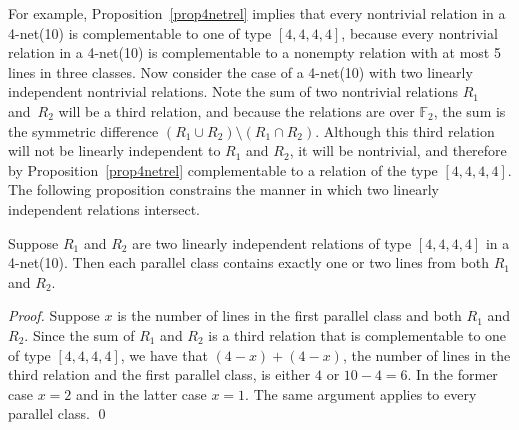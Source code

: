 \documentclass[runningheads]{llncs}
\newcommand{\F}{\mathbb{F}}
\begin{document}
For example, Proposition~\ref{prop4netrel} implies that every nontrivial relation in
a 4-net(10) is complementable to one of type $[4,4,4,4]$, because every nontrivial relation
in a 4-net(10) is complementable to a nonempty relation with at most 5 lines in three classes.
Now consider the case of a 4-net(10) with two linearly independent nontrivial relations.
Note the sum of two nontrivial relations $R_1$
and~$R_2$ will be a third relation, and because
the relations are over $\F_2$, the sum is the symmetric difference $(R_1\cup R_2)\setminus(R_1\cap R_2)$.  Although this third relation
will not be linearly independent to $R_1$ and $R_2$, it will be nontrivial, and therefore by Proposition~\ref{prop4netrel}
complementable to a relation of the type $[4,4,4,4]$.
The following proposition constrains the manner in which two linearly independent relations intersect.

\begin{proposition}\label{prop2reltypes}
Suppose\/ $R_1$ and\/ $R_2$ are two linearly independent relations of type $[4,4,4,4]$ in a 4-net(10).
Then each parallel class contains exactly one or two lines from both\/ $R_1$ and\/ $R_2$.
\end{proposition}
\begin{proof}
Suppose $x$ is the number of lines in the first parallel class and both $R_1$ and $R_2$.
Since the sum of $R_1$ and $R_2$ is a third relation that is complementable to one of type $[4,4,4,4]$,
we have that $(4-x)+(4-x)$, the number of lines in the third relation and the first parallel class,
is either $4$ or $10-4=6$.
In the former case $x=2$ and in the latter case $x=1$.  The same argument applies to every parallel class. \qed
\end{proof}
\end{document}
